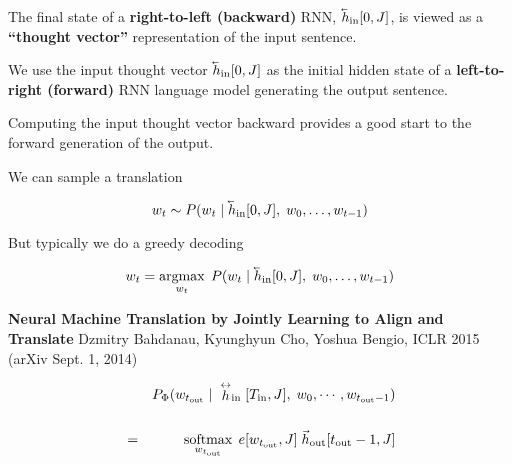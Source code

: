 {


\vfill
The final state of a {\bf right-to-left (backward)} RNN, $\cev{h}_{\mathrm{in}}[0,J]$, is viewed as a {\bf ``thought vector''} representation of the input sentence.

\vfill
We use the input thought vector $\cev{h}_{\mathrm{in}}[0,J]$ as the initial hidden state of a {\bf left-to-right (forward)} RNN language model
generating the output sentence.

\vfill
Computing the input thought vector backward provides a good start to the forward generation of the output.


We can sample a translation

$$w_t \sim P(w_t\;|\;\cev{h}_{\mathrm{in}}[0,J],\;w_0,\ldots,w_{t-1})$$

\vfill
But typically we do a greedy decoding

$$w_t = \argmax_{w_t}\; P(w_t\;|\;\cev{h}_{\mathrm{in}}[0,J],\;w_0,\ldots,w_{t-1})$$


{\bf Neural Machine Translation by Jointly Learning to {\color{red} Align} and Translate}
Dzmitry Bahdanau, Kyunghyun Cho, Yoshua Bengio, ICLR 2015 (arXiv Sept. 1, 2014)

{\huge
\begin{eqnarray*}
   & &    P_\Phi(w_{t_\mathrm{out}}\;|\;\stackrel{\leftrightarrow}{h}_\mathrm{in}[T_{\mathrm{in}},J],\;w_0,\cdots,w_{{t_\mathrm{out}}-1}) \\
   \\
  & = & \operatorname*{softmax}_{w_{t_\mathrm{out}}}\;e[w_{t_\mathrm{out}},J]\;\vec{h}_\mathrm{out}[t_\mathrm{out}-1,J] \\
\end{eqnarray*}

}}
